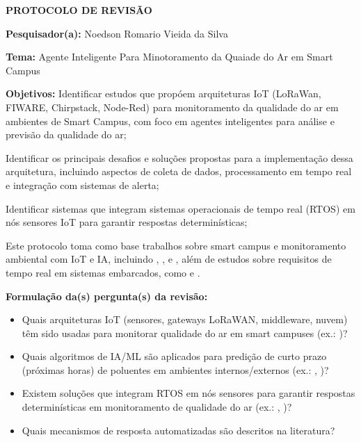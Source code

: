 \documentclass[12pt,a4paper]{article}
\begin{document}
\begin{center}
{\Large \textbf{PROTOCOLO DE REVISÃO}}
\end{center}
\vspace{1cm}

\noindent \textbf{Pesquisador(a):} Noedson Romario Vieida da Silva

\vspace{0.5cm}
\noindent \textbf{Tema:} Agente Inteligente Para Minotoramento da Quaiade do Ar em Smart Campus

\vspace{0.5cm}
\noindent \textbf{Objetivos:} Identificar estudos que propóem arquiteturas
IoT (LoRaWan, FIWARE, Chirpstack, Node-Red) para monitoramento da qualidade
do ar em ambientes de Smart Campus, com foco em agentes inteligentes para
análise e previsão da qualidade do ar;


Identificar os principais desafios e soluções propostas para a implementação
dessa arquitetura, incluindo aspectos de coleta de dados, processamento em
tempo real e integração com sistemas de alerta;

Identificar sistemas que integram sistemas operacionais de tempo real (RTOS)
em nós sensores IoT para garantir respostas determinísticas;

\vspace{0.3cm}
\noindent Este protocolo toma como base trabalhos sobre smart campus e monitoramento ambiental com IoT e IA, incluindo \textcite{minallah2020}, \textcite{cunha2024}, \textcite{kumar2023} e \textcite{wcama}, além de estudos sobre requisitos de tempo real em sistemas embarcados, como \textcite{reddy2023} e \textcite{septian2022}.

\vspace{0.5cm}
\noindent \textbf{Formulação da(s) pergunta(s) da revisão:}
\begin{itemize}[label={\textbullet}, nosep]
\item Quais arquiteturas IoT (sensores, gateways LoRaWAN, middleware, nuvem)
têm sido usadas para monitorar qualidade do ar em smart campuses (ex.: \textcite{cunha2024})?
\item Quais algoritmos de IA/ML são aplicados para predição de curto prazo
(próximas horas) de poluentes em ambientes internos/externos (ex.: \textcite{kumar2023}, \textcite{wcama})?
\item Existem soluções que integram RTOS em nós sensores para garantir respostas
determinísticas em monitoramento de qualidade do ar (ex.: \textcite{septian2022}, \textcite{alves2025freertos})?
\item Quais mecanismos de resposta automatizadas são descritos na literatura?
\end{itemize}
\end{document}
